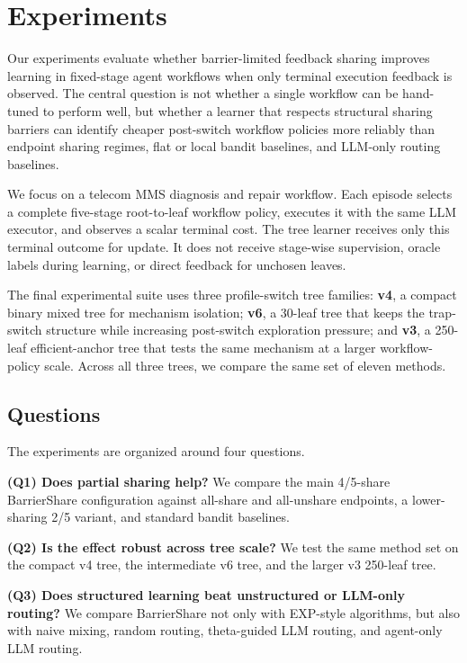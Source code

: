 \section{Experiments}
\label{sec:experiments}

Our experiments evaluate whether barrier-limited feedback sharing improves learning in fixed-stage agent workflows when only terminal execution feedback is observed. The central question is not whether a single workflow can be hand-tuned to perform well, but whether a learner that respects structural sharing barriers can identify cheaper post-switch workflow policies more reliably than endpoint sharing regimes, flat or local bandit baselines, and LLM-only routing baselines.

We focus on a telecom MMS diagnosis and repair workflow. Each episode selects a complete five-stage root-to-leaf workflow policy, executes it with the same LLM executor, and observes a scalar terminal cost. The tree learner receives only this terminal outcome for update. It does not receive stage-wise supervision, oracle labels during learning, or direct feedback for unchosen leaves.

The final experimental suite uses three profile-switch tree families:
\textbf{v4}, a compact binary mixed tree for mechanism isolation;
\textbf{v6}, a 30-leaf tree that keeps the trap-switch structure while increasing post-switch exploration pressure; and
\textbf{v3}, a 250-leaf efficient-anchor tree that tests the same mechanism at a larger workflow-policy scale. Across all three trees, we compare the same set of eleven methods.

\subsection{Questions}
\label{sec:exp_questions}

The experiments are organized around four questions.

\textbf{(Q1) Does partial sharing help?}
We compare the main 4/5-share BarrierShare configuration against all-share and all-unshare endpoints, a lower-sharing 2/5 variant, and standard bandit baselines.

\textbf{(Q2) Is the effect robust across tree scale?}
We test the same method set on the compact v4 tree, the intermediate v6 tree, and the larger v3 250-leaf tree.

\textbf{(Q3) Does structured learning beat unstructured or LLM-only routing?}
We compare BarrierShare not only with EXP-style algorithms, but also with naive mixing, random routing, theta-guided LLM routing, and agent-only LLM routing.

